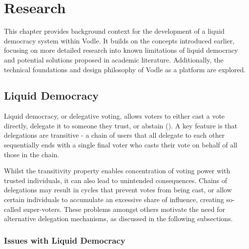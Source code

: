 \chapter{Research}
\label{ch:background}

This chapter provides background context for the development of a liquid democracy system within Vodle. It builds on the concepts introduced earlier, focusing on more detailed research into known limitations of liquid democracy and potential solutions proposed in academic literature. Additionally, the technical foundations and design philosophy of Vodle as a platform are explored.

\section{Liquid Democracy}

Liquid democracy, or delegative voting, allows voters to either cast a vote directly, delegate it to someone they trust, or abstain (\cite{blum_liquid_2016}). A key feature is that delegations are transitive - a chain of users that all delegate to each other sequentially ends with a single final voter who casts their vote on behalf of all those in the chain.

Whilst the transitivity property enables concentration of voting power with trusted individuals, it can also lead to unintended consequences. Chains of delegations may result in cycles that prevent votes from being cast, or allow certain individuals to accumulate an excessive share of influence, creating so-called super-voters. These problems amongst others motivate the need for alternative delegation mechanisms, as discussed in the following subsections.


\subsection{Issues with Liquid Democracy}

